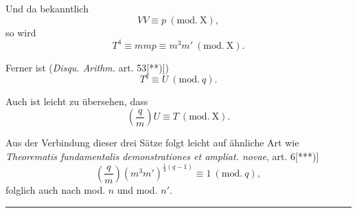 Und da bekanntlich
\[
VV\equiv p\ (\mathrm{mod.}\ \mathrm X),
\]
\noindent so wird
\[
T^4\equiv mmp\equiv m^3m'\ (\mathrm{mod.}\ \mathrm X).
\]
\par\noindent\hspace*{\parindent}Ferner ist (\textit{Disqu. Arithm.} art. 53[**)])
\[
T^q\equiv U\ (\mathrm{mod.}\ q).
\]
\par\noindent\hspace*{\parindent}Auch ist leicht zu übersehen, dass
\[
\left(\frac qm\right)U\equiv T\ (\mathrm{mod.}\ \mathrm X).
\]
\par\noindent\hspace*{\parindent}Aus der Verbindung dieser drei Sätze folgt leicht auf ähnliche Art wie \textit{Theorematis fundamentalis demonstrationes et ampliat. novae}, art. 6[***)]
\[
\left(\frac qm\right)(m^3m')^{\frac14(q-1)}\equiv1\ (\mathrm{mod.}\ q),
\]
\noindent folglich auch nach mod. $n$ und mod. $n'$.
\par\vfill\noindent\rule{.25\linewidth}{.4pt}\par\smallskip
\begingroup\footnotesize
\noindent[*) Werke I, S. 422; II, S. 82ff.]\par
\noindent[**) Werke I, S. 43.]\par
\noindent[***) Werke II, S. 58.]\par
\endgroup\clearpage

